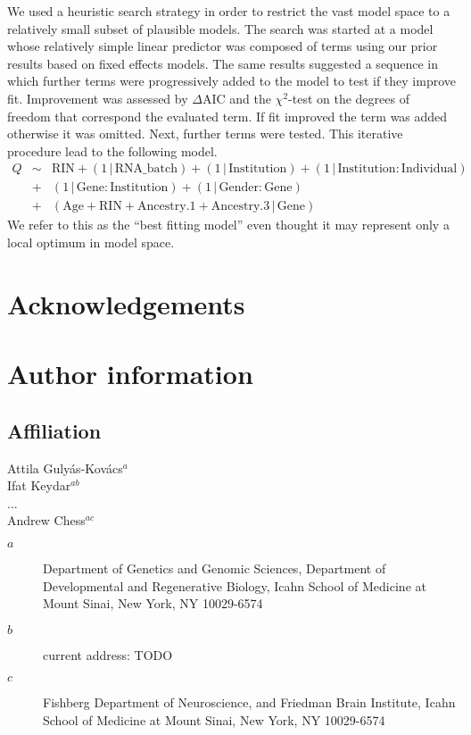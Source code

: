\documentclass[letterpaper]{article}
\begin{document}
We used a heuristic search strategy in order to restrict
the vast model space to a relatively small subset of plausible models.  The
search was started at a model whose relatively simple linear predictor was composed of terms
using our prior results based on fixed effects models.  The same results
suggested a sequence in which further terms were progressively added to the
model to test if they improve fit.  Improvement was assessed by \(\Delta
\mathrm{AIC}\) and the \(\chi^2\)-test on the degrees of freedom that
correspond the evaluated term.  If fit improved the term was added otherwise
it was omitted.  Next, further terms were tested.  This iterative procedure
lead to the following model.
\begin{eqnarray*}
Q &\sim&
\mathrm{RIN} + (1 \,|\, \mathrm{RNA\_batch}) + (1 \,|\, \mathrm{Institution}) + (1 \,|\,
\mathrm{Institution}:\mathrm{Individual}) \\
&+& (1 \,|\, \mathrm{Gene}:\mathrm{Institution}) + (1 \,|\, \mathrm{Gender}:\mathrm{Gene}) \\
&+& (\mathrm{Age} + \mathrm{RIN} + \mathrm{Ancestry.1} + \mathrm{Ancestry.3} \,|\, \mathrm{Gene})
\end{eqnarray*}
We refer to this as the ``best
fitting model'' even thought it may represent only a local optimum in model
space.

\clearpage


\clearpage
\section{Acknowledgements}

\clearpage
\section{Author information}

\subsection{Affiliation}

Attila Guly\'{a}s-Kov\'{a}cs\(^a\)\\
Ifat Keydar\(^{ab}\)\\
...\\
Andrew Chess\(^{ac}\)

\begin{description}
\item[\(a\)] 
Department of Genetics and Genomic Sciences, Department of Developmental and
Regenerative Biology, Icahn School of Medicine at Mount Sinai, New York, NY 10029-6574
\item[\(b\)] 
current address: TODO
\item[\(c\)] 
Fishberg Department of Neuroscience, and Friedman Brain
Institute, Icahn School of Medicine at Mount Sinai, New York, NY 10029-6574
\end{description}
\end{document}
